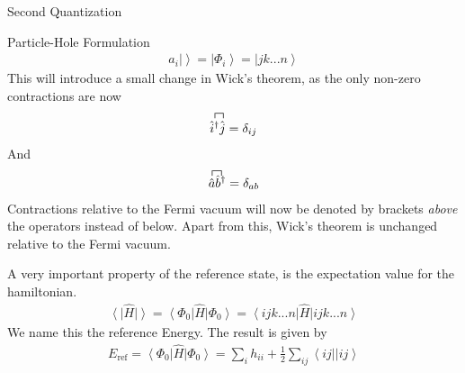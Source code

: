 \documentclass[twoside,english]{uiofysmaster}
\begin{document}
\begin{chapter}{Second Quantization}
\begin{section}{Particle-Hole Formulation}
		\begin{align}
			\hat a_i \left| \right> = \left| \Phi_i \right> = \left| jk ... n \right>
		\end{align}
		This will introduce a small change in Wick's theorem, as the only non-zero contractions are now 
		\begin{align}
			\contraction{}{\hat i^\dagger}{}{\hat j}
			\hat i^\dagger \hat j = \delta_{ij}
		\end{align}
		And 
		\begin{align}
			\contraction{}{\hat a}{}{\hat b^\dagger}
			\hat a \hat b^\dagger = \delta_{ab}
		\end{align}
		Contractions relative to the Fermi vacuum will now be denoted by brackets \textit{above} the operators instead of below. Apart from this, Wick's theorem is unchanged relative to the Fermi vacuum. \par 


		A very important property of the reference state, is the expectation value for the hamiltonian. 
		\begin{align}
			\left< \right| \hat H \left| \right> = \left< \Phi_0 \right| \hat H \left| \Phi_0 \right> = \left< ijk...n \right| \hat H \left| ijk...n\right> 
		\end{align}
		We name this the reference Energy. The result is given by \cite{ShavittAndBartlett}
		\begin{align}
			E_{\text{ref}} = \left< \Phi_0 \right| \hat H \left| \Phi_0 \right> = \sum_i h_{ii} + \frac{1}{2} \sum_{ij} \left< ij || ij \right>
		\end{align}

	\end{section}


\end{chapter}
\end{document}
